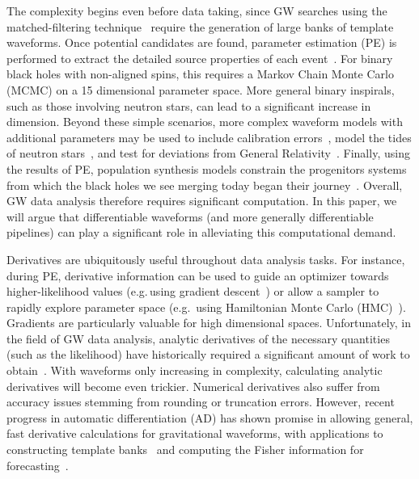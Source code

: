 \documentclass[twocolumn]{aastex631}
\begin{document}
The complexity begins even before data taking, since GW searches using the matched-filtering technique~\citep{Owen:1998dk, Owen:1995tm} require the generation of large banks of template waveforms.
Once potential candidates are found, parameter estimation (PE) is performed to extract the detailed source properties of each event~\citep{Christensen:2022bxb, 2020MNRAS.493.3132S, Ashton:2018jfp, Romero-Shaw:2020owr, Veitch:2014wba, Biwer:2018osg, kombine, 10.1093/mnras/stv2422}.
For binary black holes with non-aligned spins, this requires a Markov Chain Monte Carlo (MCMC) on a 15 dimensional parameter space.
More general binary inspirals, such as those involving neutron stars, can lead to a significant increase in dimension.
Beyond these simple scenarios, more complex waveform models with additional parameters may be used to include calibration errors~\citep{Farr:2014,Vitale:2020gvb}, model the tides of neutron stars~\citep{LIGOScientific:2018hze}, and test for deviations from General Relativity~\citep{Arun:2006yw, Agathos:2013upa, Yunes:2016jcc, LIGOScientific:2016lio, LIGOScientific:2020tif, Krishnendu:2021fga}.
Finally, using the results of PE, population synthesis models constrain the progenitors systems from which the black holes we see merging today began their journey~\citep{LIGOScientific:2020kqk, LIGOScientific:2021psn, Wong:2022flg}.
Overall, GW data analysis therefore requires significant computation.
In this paper, we will argue that differentiable waveforms (and more generally differentiable pipelines) can play a significant role in alleviating this computational demand.

Derivatives are ubiquitously useful throughout data analysis tasks.
For instance, during PE, derivative information can be used to guide an optimizer towards higher-likelihood values (e.g.\,using gradient descent~\citep{2016arXiv160904747R}) or allow a sampler to rapidly explore parameter space (e.g.\, using Hamiltonian Monte Carlo (HMC)~\citep{2011hmcm.book..113N,2017arXiv170102434B}).
Gradients are particularly valuable for high dimensional spaces.
Unfortunately, in the field of GW data analysis, analytic derivatives of the necessary quantities (such as the likelihood) have historically required a significant amount of work to obtain~\citep{Keppel:2013kia}.
With waveforms only increasing in complexity, calculating analytic derivatives will become even trickier.
Numerical derivatives also suffer from accuracy issues stemming from rounding or truncation errors.
However, recent progress in automatic differentiation (AD) has shown promise in allowing general, fast derivative calculations for gravitational waveforms, with applications to constructing template banks~\citep{Coogan:2022qxs} and computing the Fisher information for forecasting~\citep{Iacovelli:2022bbs, Iacovelli:2022mbg}.
\end{document}
